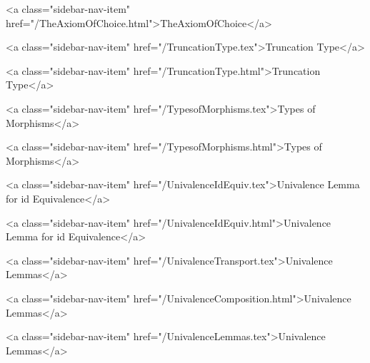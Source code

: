       
    
      
        
          <a class="sidebar-nav-item" href="/TheAxiomOfChoice.html">TheAxiomOfChoice</a>
        
      
    
      
        
          <a class="sidebar-nav-item" href="/TruncationType.tex">Truncation Type</a>
        
      
    
      
        
          <a class="sidebar-nav-item" href="/TruncationType.html">Truncation Type</a>
        
      
    
      
        
          <a class="sidebar-nav-item" href="/TypesofMorphisms.tex">Types of Morphisms</a>
        
      
    
      
        
          <a class="sidebar-nav-item" href="/TypesofMorphisms.html">Types of Morphisms</a>
        
      
    
      
        
          <a class="sidebar-nav-item" href="/UnivalenceIdEquiv.tex">Univalence Lemma for id Equivalence</a>
        
      
    
      
        
          <a class="sidebar-nav-item" href="/UnivalenceIdEquiv.html">Univalence Lemma for id Equivalence</a>
        
      
    
      
        
          <a class="sidebar-nav-item" href="/UnivalenceTransport.tex">Univalence Lemmas</a>
        
      
    
      
        
          <a class="sidebar-nav-item" href="/UnivalenceComposition.html">Univalence Lemmas</a>
        
      
    
      
        
          <a class="sidebar-nav-item" href="/UnivalenceLemmas.tex">Univalence Lemmas</a>
        
      
    
      
        
